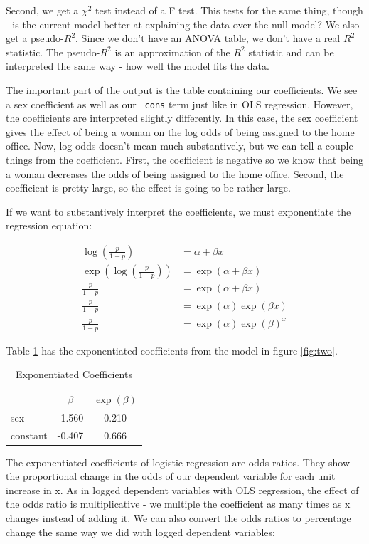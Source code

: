 \documentclass[12pt]{amsart}
\begin{document}
Second, we get a $\chi^2$ test instead of a F test. This tests for the same thing, though - is the current model better at explaining the data over the null model? We also get a pseudo-$R^2$. Since we don't have an ANOVA table, we don't have a real $R^2$ statistic. The pseudo-$R^2$ is an approximation of the $R^2$ statistic and can be interpreted the same way - how well the model fits the data.

The important part of the output is the table containing our coefficients. We see a sex coefficient as well as our \texttt{\_cons} term just like in OLS regression. However, the coefficients are interpreted slightly differently. In this case, the sex coefficient gives the effect of being a woman on the log odds of being assigned to the home office. Now, log odds doesn't mean much substantively, but we can tell a couple things from the coefficient. First, the coefficient is negative so we know that being a woman decreases the odds of being assigned to the home office. Second, the coefficient is pretty large, so the effect is going to be rather large. 

If we want to substantively interpret the coefficients, we must exponentiate the regression equation:

\begin{align*}
\log \left( \frac{p}{1-p} \right) &= \alpha + \beta x\\
\exp \left( \log \left( \frac{p}{1-p} \right) \right) &= \exp ( \alpha + \beta x)\\
\frac{p}{1-p} &= \exp( \alpha + \beta x ) \\
\frac{p}{1-p} &= \exp ( \alpha ) \exp ( \beta x ) \\
\frac{p}{1-p} &= \exp ( \alpha ) \exp ( \beta )^x
\end{align*}

Table \ref{tab:one} has the exponentiated coefficients from the model in figure \ref{fig:two}.

\begin{table}[htb]
\caption{Exponentiated Coefficients\label{tab:one}}
\begin{tabular}{l c c}
\hline
& $\beta$ & $\exp(\beta)$\\
\hline
sex & -1.560 & 0.210\\
constant & -0.407 & 0.666\\
\hline
\end{tabular}
\end{table}

The exponentiated coefficients of logistic regression are odds ratios.  They show the proportional change in the odds of our dependent variable for each unit increase in x. As in logged dependent variables with OLS regression, the effect of the odds ratio is multiplicative - we multiple the coefficient as many times as x changes instead of adding it. We can also convert the odds ratios to percentage change the same way we did with logged dependent variables:
\end{document}
